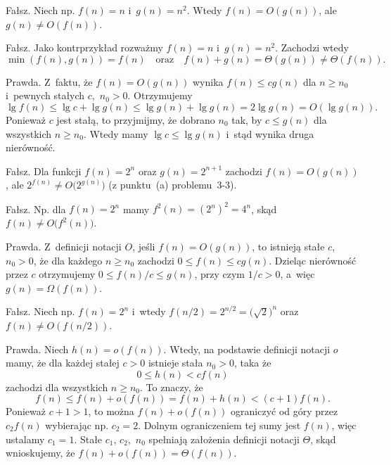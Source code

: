 
\subexercise{} %
Fałsz. Niech np. $f(n)=n$ i~$g(n)=n^2$. Wtedy $f(n)=O(g(n))$, ale $g(n)\ne O(f(n))$.

\subexercise{} %
Fałsz. Jako kontrprzykład rozważmy $f(n)=n$ i~$g(n)=n^2$. Zachodzi wtedy
\[
	\min(f(n),g(n)) = f(n) \quad\text{oraz}\quad f(n)+g(n) = \Theta(g(n)) \ne \Theta(f(n)).
\]

\subexercise{} %
Prawda. Z~faktu, że $f(n)=O(g(n))$ wynika $f(n)\le cg(n)$ dla $n\ge n_0$ i~pewnych stałych $c$,~$n_0>0$. Otrzymujemy
\[
	\lg f(n) \le \lg c+\lg g(n) \le \lg g(n)+\lg g(n) = 2\lg g(n) = O(\lg g(n)).
\]
Ponieważ $c$ jest stałą, to przyjmijmy, że dobrano $n_0$ tak, by $c\le g(n)$ dla wszystkich $n\ge n_0$. Wtedy mamy $\lg c\le\lg g(n)$ i~stąd wynika druga nierówność.

\subexercise{} %
Fałsz. Dla funkcji $f(n)=2^n$ oraz $g(n)=2^{n+1}$ zachodzi $f(n)=O(g(n))$, ale $2^{f(n)}\ne O\bigl(2^{g(n)}\bigr)$ (z punktu~(a) problemu~3-3).

\subexercise{} %
Fałsz. Np. dla $f(n)=2^n$ mamy $f^2(n)=(2^n)^2=4^n$, skąd $f(n)\ne O\bigl(f^2(n)\bigr)$.

\subexercise{} %
Prawda. Z~definicji notacji $O$, jeśli $f(n)=O(g(n))$, to istnieją stałe $c$,~$n_0>0$, że dla każdego $n\ge n_0$ zachodzi $0\le f(n)\le cg(n)$. Dzieląc nierówność przez $c$ otrzymujemy $0\le f(n)/c\le g(n)$, przy czym $1/c>0$, a~więc $g(n)=\Omega(f(n))$.

\subexercise{} %
Fałsz. Niech np. $f(n)=2^n$ i~wtedy $f(n/2)=2^{n/2}={\bigl(\!\sqrt{2}\bigr)}^n$ oraz $f(n)\ne O(f(n/2))$.

\subexercise{} %
Prawda. Niech $h(n)=o(f(n))$. Wtedy, na podstawie definicji notacji $o$ mamy, że dla każdej stałej $c>0$ istnieje stała $n_0>0$, taka że
\[
	0 \le h(n) < cf(n)
\]
zachodzi dla wszystkich $n\ge n_0$. To znaczy, że
\[
	f(n) \le f(n)+o(f(n)) = f(n)+h(n) < (c+1)f(n).
\]
Ponieważ $c+1>1$, to można $f(n)+o(f(n))$ ograniczyć od góry przez $c_2f(n)$ wybierając np. $c_2=2$. Dolnym ograniczeniem tej sumy jest $f(n)$, więc ustalamy $c_1=1$. Stałe $c_1$, $c_2$,~$n_0$ spełniają założenia definicji notacji $\Theta$, skąd wnioskujemy, że $f(n)+o(f(n))=\Theta(f(n))$.

\bigskip
{}

